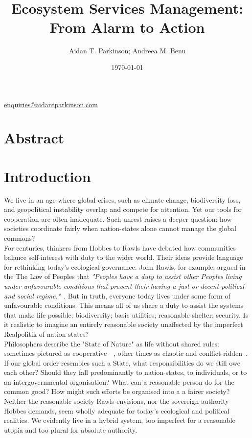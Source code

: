 \documentclass[11pt, oneside]{article}   	%
\title{Ecosystem Services Management: From Alarm to Action}
\author{Aidan T. Parkinson; Andreea M. Benu}
\date{\today}							%
\begin{document}
\maketitle
\begin{center}
\href{mailto:enquiries@aidantparkinson.com}{enquiries@aidantparkinson.com}
\end{center}

\section{Abstract}


\section{Introduction}

We live in an age where global crises, such as climate change, biodiversity loss, and geopolitical instability overlap and compete for attention.
Yet our tools for cooperation are often inadequate.
Such unrest raises a deeper question: how societies coordinate fairly when nation-states alone cannot manage the global commons?\\

For centuries, thinkers from Hobbes to Rawls have debated how communities balance self-interest with duty to the wider world.
Their ideas provide language for rethinking today's ecological governance.
John Rawls, for example, argued in the The Law of Peoples that \emph{"Peoples have a duty to assist other Peoples living under unfavourable conditions that prevent their having a just or decent political and social regime."}~\cite{jr2}.
But in truth, everyone today lives under some form of unfavourable conditions.
This means all of us share a duty to assist the systems that make life possible: biodiversity; basic utilities; reasonable shelter; security.
Is it realistic to imagine an entirely reasonable society unaffected by the imperfect Realpolitik of nation-states?\\

Philosophers describe the "State of Nature" as life without shared rules: sometimes pictured as cooperative~\cite{jl1}~\cite{rn1}, other times as chaotic and conflict-ridden~\cite{th1}.
If our global order resembles such a State, what responsibilities do we still owe each other?
Should they fall predominantly to nation-states, to individuals, or to an intergovernmental organisation?
What can a reasonable person do for the common good?
How might such efforts be organised into a a fairer society?
Neither the reasonable society Rawls envisions, nor the sovereign authority Hobbes demands, seem wholly adequate for today's ecological and political realities.
We evidently live in a hybrid system, too imperfect for a reasonable utopia and too plural for absolute authority.\\
\end{document}
